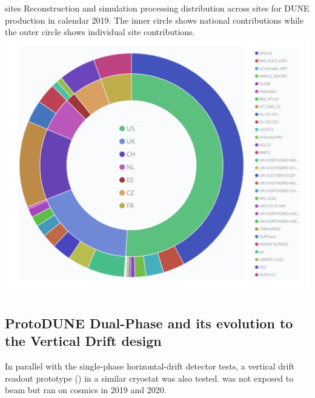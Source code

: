 \documentclass[../main-v1.tex]{subfiles}
\begin{document}
\begin{dunefigure}
{sites} %
{Reconstruction and simulation processing distribution across sites for DUNE production in calendar 2019.  The inner circle shows national contributions while the outer circle shows individual site contributions.}
\includegraphics[height=0.65\textwidth]{graphics/IntroFigures/Fig_8.pdf}
\end{dunefigure}

\subsection{ProtoDUNE Dual-Phase and its evolution to the Vertical Drift design }


In parallel with the single-phase horizontal-drift detector tests, a vertical drift   readout prototype ()
in a similar cryostat was also  tested.   was not exposed to beam but ran on cosmics in 2019 and 2020. 
\end{document}
